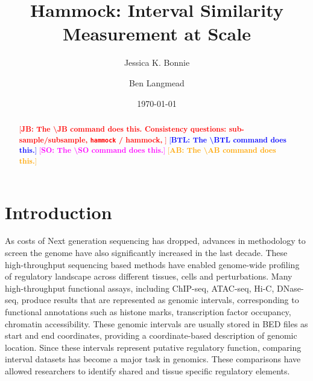 \documentclass[11pt]{article}
\newcommand{\BTL}[1]{\textcolor{blue}{[\textbf{BTL: #1}]}}
\newcommand{\JB}[1]{\textcolor{red}{[\textbf{JB: #1}]}}
\newcommand{\SO}[1]{\textcolor{magenta}{[\textbf{SO: #1}]}}
\newcommand{\AB}[1]{\textcolor{orange}{[\textbf{AB: #1}]}}
\newcommand{\program}[1]{\texttt{#1}}
\newif\ifpreprint
\begin{document}
\title{Hammock: Interval Similarity Measurement at Scale}

\author[1, *]{Jessica K. Bonnie}
\author[1, *]{Ben Langmead}
\date{\today}

\maketitle

\ifpreprint
\else
\thispagestyle{empty}

\newpage
\setcounter{page}{1}
\fi

\begin{abstract}
\JB{The \textbackslash JB command does this. Consistency questions: sub-sample/subsample, \program{hammock} / hammock, }
\BTL{The \textbackslash BTL command does this.}
\SO{The \textbackslash SO command does this.}
\AB{The \textbackslash AB command does this.}




\end{abstract}

\vspace{-4mm}
\section{Introduction}
\vspace{-2mm}
As costs of Next generation sequencing has dropped, advances in methodology to screen the genome have also significantly increased in the last decade. These high-throughput sequencing based methods have enabled genome-wide profiling of regulatory landscape across different tissues, cells and perturbations. Many high-throughput functional assays, including ChIP-seq, ATAC-seq, Hi-C, DNase-seq, produce results that are represented as genomic intervals, corresponding to functional annotations such as histone marks, transcription factor occupancy, chromatin accessibility. These genomic intervals are usually  stored in BED files as start and end coordinates, providing a coordinate-based description of genomic location. Since these intervals represent putative regulatory function, comparing interval datasets has become a major task in genomics. These comparisons have allowed researchers to identify shared and tissue specific regulatory elements.
\end{document}
